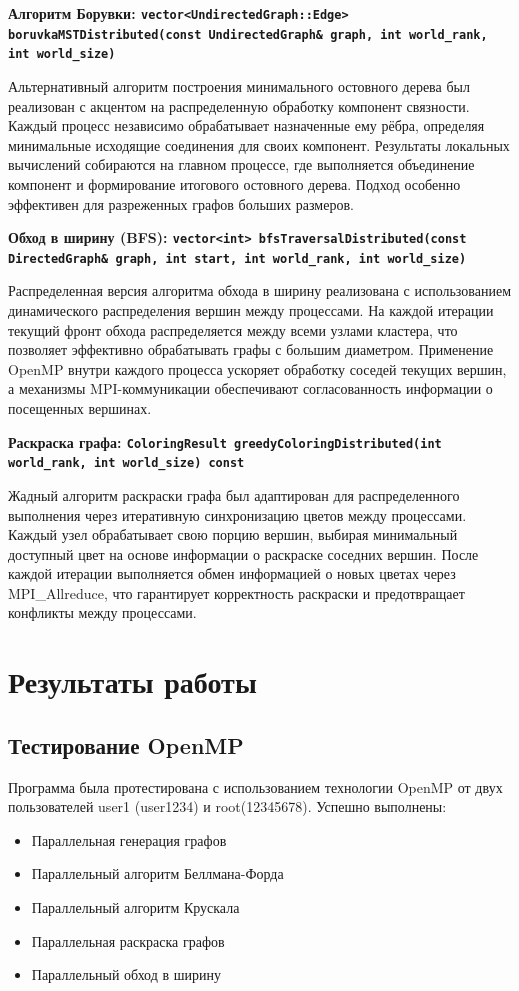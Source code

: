 \documentclass[11pt,a4paper,final]{article}
\begin{document}
\textbf{Алгоритм Борувки: \texttt{vector<UndirectedGraph::Edge> boruvkaMSTDistributed(const UndirectedGraph\& graph, int world\_rank, int world\_size)}}

Альтернативный алгоритм построения минимального остовного дерева был реализован с акцентом на распределенную обработку компонент связности. Каждый процесс независимо обрабатывает назначенные ему рёбра, определяя минимальные исходящие соединения для своих компонент. Результаты локальных вычислений собираются на главном процессе, где выполняется объединение компонент и формирование итогового остовного дерева. Подход особенно эффективен для разреженных графов больших размеров.

\textbf{Обход в ширину (BFS): \texttt{vector<int> bfsTraversalDistributed(const DirectedGraph\& graph, int start, int world\_rank, int world\_size)}}

Распределенная версия алгоритма обхода в ширину реализована с использованием динамического распределения вершин между процессами. На каждой итерации текущий фронт обхода распределяется между всеми узлами кластера, что позволяет эффективно обрабатывать графы с большим диаметром. Применение OpenMP внутри каждого процесса ускоряет обработку соседей текущих вершин, а механизмы MPI-коммуникации обеспечивают согласованность информации о посещенных вершинах.

\textbf{Раскраска графа: \texttt{ColoringResult greedyColoringDistributed(int world\_rank, int world\_size) const}}

Жадный алгоритм раскраски графа был адаптирован для распределенного выполнения через итеративную синхронизацию цветов между процессами. Каждый узел обрабатывает свою порцию вершин, выбирая минимальный доступный цвет на основе информации о раскраске соседних вершин. После каждой итерации выполняется обмен информацией о новых цветах через MPI\_Allreduce, что гарантирует корректность раскраски и предотвращает конфликты между процессами.

\newpage
\section{Результаты работы}

\subsection{Тестирование OpenMP}

Программа была протестирована с использованием технологии OpenMP от двух пользователей user1 (user1234) и root(12345678). Успешно выполнены:
\begin{itemize}
	\item Параллельная генерация графов
	\item Параллельный алгоритм Беллмана-Форда
	\item Параллельный алгоритм Крускала
	\item Параллельная раскраска графов
	\item Параллельный обход в ширину
\end{itemize}
\end{document}
